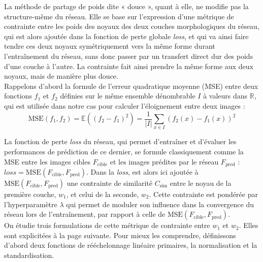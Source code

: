 La méthode de partage de poids dite « douce », quant à elle, ne modifie pas la structure-même du réseau.
Elle se base sur l'expression d'une métrique de contrainte entre les poids des noyaux des deux couches morphologiques du réseau, qui est alors ajoutée dans la fonction de perte globale \textit{loss}, et qui va ainsi faire tendre ces deux noyaux symétriquement vers la même forme durant l'entraînement du réseau, sans donc passer par un transfert direct dur des poids d'une couche à l'autre. 
La contrainte fait ainsi prendre la même forme aux deux noyaux, mais de manière plus douce. \\

\vspace{-2.0mm}
Rappelons d'abord la formule de l'erreur quadratique moyenne (MSE) entre deux fonctions $f_1$ et $f_2$ définies sur le même ensemble dénombrable $I$ à valeurs dans $\mathbb{R}$, qui est utilisée dans notre cas pour calculer l'éloignement entre deux images : \\

\vspace{-4.4mm}
\begin{equation}
    \text{MSE} (f_1,f_2) = \mathbb{E} \left ( (f_2-f_1)^2 \right ) = \frac{1}{|I|} \sum_{x \in I} \left ( f_2(x) - f_1(x) \right ) ^2
    \label{MSE}
\end{equation}

\vspace{2.5mm}
La fonction de perte \textit{loss} du réseau, qui permet d'entraîner et d'évaluer les performances de prédiction de ce dernier, se formule classiquement comme la MSE entre les images cibles $F_\text{cible}$ et les images prédites par le réseau $F_\text{pred}$ : $\textit{loss} = \text{MSE}(F_\text{cible},F_\text{pred})$. 
Dans la \textit{loss}, est alors ici ajoutée à $\text{MSE}(F_\text{cible},F_\text{pred})$ une contrainte de similarité $C_\text{sim}$ entre le noyau de la première couche, $w_1$, et celui de la seconde, $w_2$. 
Cette contrainte est pondérée par l'hyperparamètre $\lambda$ qui permet de moduler son influence dans la convergence du réseau lors de l'entraînement, par rapport à celle de $\text{MSE}(F_\text{cible},F_\text{pred})$. \\

\vspace{-2.0mm}
\noindent On étudie trois formulations de cette métrique de contrainte entre $w_1$ et $w_2$. Elles sont explicitées à la page suivante. Pour mieux les comprendre, définissons d'abord deux fonctions de rééchelonnage linéaire primaires, la normalisation et la standardisation. \\

